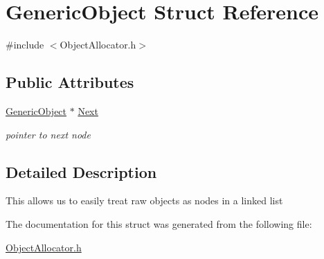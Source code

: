 \hypertarget{structGenericObject}{\section{Generic\-Object Struct Reference}
\label{structGenericObject}
}


{\ttfamily \#include $<$Object\-Allocator.\-h$>$}

\subsection*{Public Attributes}
\begin{DoxyCompactItemize}
\item 
\hypertarget{structGenericObject_a7c680fad98f506bf301e645ebb1b453e}{\hyperlink{structGenericObject}{Generic\-Object} $\ast$ \hyperlink{structGenericObject_a7c680fad98f506bf301e645ebb1b453e}{Next}}\label{structGenericObject_a7c680fad98f506bf301e645ebb1b453e}

\begin{DoxyCompactList}\small\item\em pointer to next node \end{DoxyCompactList}\end{DoxyCompactItemize}


\subsection{Detailed Description}
This allows us to easily treat raw objects as nodes in a linked list 

The documentation for this struct was generated from the following file\-:\begin{DoxyCompactItemize}
\item 
\hyperlink{ObjectAllocator_8h}{Object\-Allocator.\-h}\end{DoxyCompactItemize}
